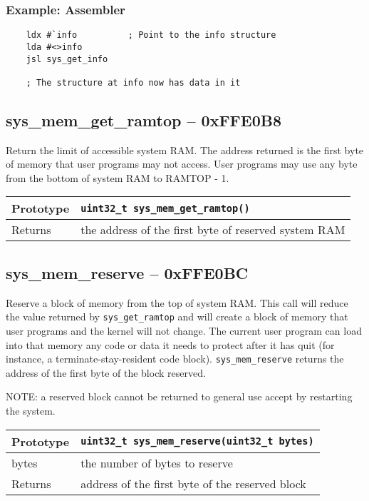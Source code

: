 \subsubsection*{Example: Assembler}
\begin{verbatim}
    ldx #`info			; Point to the info structure
    lda #<>info
    jsl sys_get_info

    ; The structure at info now has data in it
\end{verbatim}


\subsection*{sys\_mem\_get\_ramtop -- 0xFFE0B8}
Return the limit of accessible system RAM. The address returned is the first byte of memory that user programs may not access. User programs may use any byte from the bottom of system RAM to RAMTOP - 1.

\bigskip

\begin{tabular}{|l||l|} \hline
Prototype & \lstinline!uint32_t sys_mem_get_ramtop()! \\ \hline
Returns & the address of the first byte of reserved system RAM \\ \hline
\end{tabular}


\subsection*{sys\_mem\_reserve -- 0xFFE0BC}
Reserve a block of memory from the top of system RAM. This call will reduce the value returned by \lstinline|sys_get_ramtop| and will create a block of memory that user programs and the kernel will not change.
The current user program can load into that memory any code or data it needs to protect after it has quit (for instance, a terminate-stay-resident code block). \lstinline|sys_mem_reserve| returns the address of the first byte of the block reserved.

NOTE: a reserved block cannot be returned to general use accept by restarting the system.

\bigskip

\begin{tabular}{|l||l|} \hline
Prototype & \lstinline!uint32_t sys_mem_reserve(uint32_t bytes)! \\ \hline
bytes & the number of bytes to reserve \\ \hline
Returns & address of the first byte of the reserved block \\ \hline
\end{tabular}

